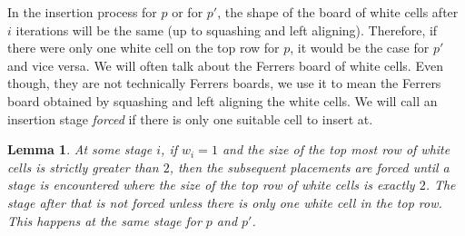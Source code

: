 \documentclass[12pt, english, a4paper]{article}
\theoremstyle{plain}
\newtheorem{lemma}[theorem]{Lemma}
\theoremstyle{definition}
\theoremstyle{remark}
\begin{document}
In the insertion process for $p$ or for $p'$, the shape of the board of white cells after $i$ iterations will be the same (up to squashing and left aligning). Therefore, if there were only one white cell on the top row for $p$, it would be the case for $p'$ and vice versa. We will often talk about the Ferrers board of white cells. Even though, they are not technically Ferrers boards, we use it to mean the Ferrers board obtained by squashing and left aligning the white cells. We will call an insertion stage \emph{forced} if there is only one suitable cell to insert at.
\begin{lemma}\label{lem: forced-descent}
    At some stage $i$, if $w_i=1$ and the size of the top most row of white cells is strictly greater than $2$, then the subsequent placements are forced until a stage is encountered where the size of the top row of white cells is exactly $2$. The stage after that is not forced unless there is only one white cell in the top row. This happens at the same stage for $p$ and $p'$.
\end{lemma}
\end{document}
